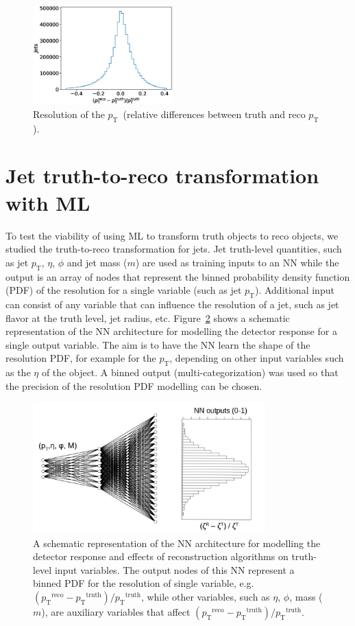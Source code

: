 \documentclass[showpacs,showkeys,preprint,prd,nofootinbib,linenumbers,12pt,superscriptaddress]{revtex4-1}
\def\pt{\ensuremath{p_{\mathrm{T}}}}
\def\ptRes{\ensuremath{(\pt^{\mathrm{reco}}-\pt^{\mathrm{truth}})/\pt^{\mathrm{truth}}}}
\begin{document}
\begin{figure}[h]
  \includegraphics[width=0.48\textwidth]{figures/nn/pTRes_nobounds_prescaling.eps}
  \caption{Resolution of the \pt\ (relative differences between truth and reco \pt).}
  \label{fig:deltaTarget}
\end{figure}

\FloatBarrier
\section{Jet truth-to-reco transformation with ML}
\label{sec:mlMethod}
To test the viability of using ML to transform truth objects to reco objects, we studied the truth-to-reco transformation for jets. Jet truth-level quantities, such as jet $\pt$, $\eta$, $\phi$ and jet mass ($m$) are used as training inputs to an NN while the output
is an array of nodes that represent the binned probability density function (PDF) of the resolution for a single variable (such as jet \pt). Additional input can consist of any variable that can influence the resolution of a jet, such as jet flavor at the truth level, jet radius, etc. Figure~\ref{ann_example} shows a schematic representation of the NN architecture for modelling the detector response for a single output variable. The aim is to have the NN learn the shape of the resolution PDF, for example for the $\pt$, depending on other input variables such as the $\eta$ of the object. A binned output (multi-categorization) was used so that the precision of the resolution PDF modelling can be chosen.

\begin{figure}[h]
  \includegraphics[width=0.8\textwidth]{figures/intro/nn_example.pdf}
  \caption{A schematic representation of the NN architecture for modelling the detector response and effects of reconstruction algorithms on truth-level input variables. The output nodes of this NN represent a binned PDF for the resolution of single variable, e.g. \ptRes, while other variables, such as $\eta$, $\phi$, mass ($m$), are auxiliary variables that affect \ptRes.}
  \label{ann_example}
\end{figure}
\end{document}
